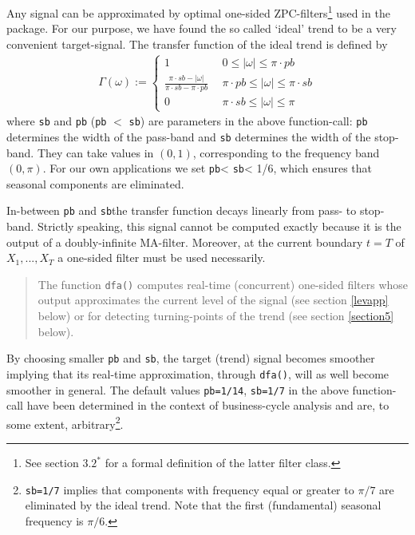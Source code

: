 \documentclass[a4paper]{article}
\begin{document}
Any signal can be approximated by optimal one-sided
ZPC-filters\footnote{See section $3.2^*$ for a formal definition of
  the latter filter class.} used in the package. For our purpose, we
have found the so called `ideal' trend to be a very convenient
target-signal.  The transfer function of the ideal trend is defined by
\begin{eqnarray}
\label{tfile} {\Gamma}(\omega):=\left\{\begin{array}{lr}1&0\leq|\omega|\leq\pi 
\cdot pb \\ \displaystyle{\frac{\pi \cdot sb-|\omega|}{\pi \cdot sb-\pi \cdot 
pb}}~~&\pi \cdot pb\leq|\omega|\leq\pi \cdot sb\\ 0&\pi \cdot sb\leq|\omega|
\leq\pi\end{array}\right. 
\end{eqnarray}
where \texttt{sb} and \texttt{pb} (\texttt{pb} $<$ \texttt{sb}) are
parameters in the above function-call: \texttt{pb} determines the
width of the pass-band and \texttt{sb} determines the width of the
stop-band. They can take values in $(0,1)$, corresponding to the
frequency band $(0, \pi)$. For our own applications we set
\texttt{pb}< \texttt{sb}< 1/6, which ensures that seasonal components
are eliminated. 

In-between \texttt{pb} and \texttt{sb}the transfer function decays
linearly from pass- to stop-band. Strictly speaking, this signal
cannot be computed exactly because it is the output of a
doubly-infinite MA-filter.  Moreover, at the current boundary $t=T$ of
$X_1,...,X_T$ a one-sided
filter must be used necessarily. \\

\begin{quote}The function \texttt{dfa()} computes real-time
  (concurrent) one-sided filters whose output approximates the current
  level of the signal (see section \ref{levapp} below) or for
  detecting turning-points of the trend (see section \ref{section5}
  below).\end{quote}


\noindent By choosing smaller \texttt{pb} and \texttt{sb}, the target
(trend) signal becomes smoother implying that its real-time
approximation, through \texttt{dfa()}, will as well become smoother in
general. The default values \texttt{pb=1/14}, \texttt{sb=1/7} in the
above function-call have been determined in the context of
business-cycle analysis and are, to some extent,
arbitrary\footnote{\texttt{sb=1/7} implies that components with
  frequency equal or greater to $\pi/7$ are eliminated by the ideal
  trend. Note that the first (fundamental) seasonal frequency is
  $\pi/6$.}.\\
\end{document}
